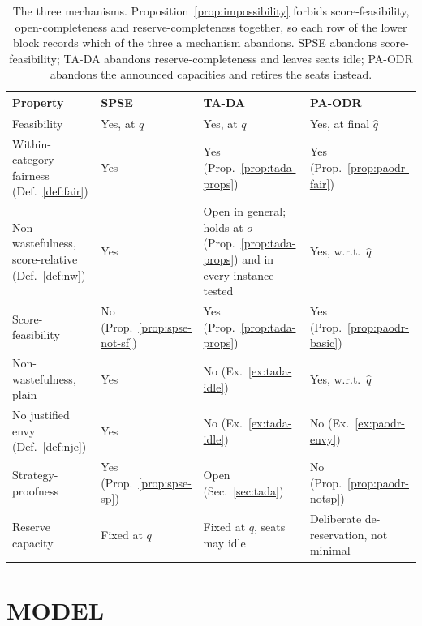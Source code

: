 \documentclass[a4paper,twoside]{article}
\theoremstyle{definition}
\begin{document}
\begin{table}[t]
\caption{The three mechanisms. Proposition~\ref{prop:impossibility} forbids score-feasibility, open-completeness and reserve-completeness together, so each row of the lower block records which of the three a mechanism abandons. SPSE abandons score-feasibility; TA-DA abandons reserve-completeness and leaves seats idle; PA-ODR abandons the announced capacities and retires the seats instead.}
\label{tab:comparison}
\centering
\small
\begin{tabular}{|L{0.22\textwidth}|L{0.20\textwidth}|L{0.24\textwidth}|L{0.24\textwidth}|}
\hline
\textbf{Property} & \textbf{SPSE} & \textbf{TA-DA} & \textbf{PA-ODR} \\
\hline
Feasibility & Yes, at $q$ & Yes, at $q$ & Yes, at final $\hat q$ \\
Within-category fairness (Def.~\ref{def:fair}) & Yes & Yes (Prop.~\ref{prop:tada-props}) & Yes (Prop.~\ref{prop:paodr-fair}) \\
Non-wastefulness, score-relative (Def.~\ref{def:nw}) & Yes & Open in general; holds at $o$ (Prop.~\ref{prop:tada-props}) and in every instance tested & Yes, w.r.t.\ $\hat q$ \\
\hline
Score-feasibility & No (Prop.~\ref{prop:spse-not-sf}) & Yes (Prop.~\ref{prop:tada-props}) & Yes (Prop.~\ref{prop:paodr-basic}) \\
Non-wastefulness, plain & Yes & No (Ex.~\ref{ex:tada-idle}) & Yes, w.r.t.\ $\hat q$ \\
No justified envy (Def.~\ref{def:nje}) & Yes & No (Ex.~\ref{ex:tada-idle}) & No (Ex.~\ref{ex:paodr-envy}) \\
Strategy-proofness & Yes (Prop.~\ref{prop:spse-sp}) & Open (Sec.~\ref{sec:tada}) & No (Prop.~\ref{prop:paodr-notsp}) \\
Reserve capacity & Fixed at $q$ & Fixed at $q$, seats may idle & Deliberate de-reservation, not minimal \\
\hline
\end{tabular}
\end{table}

\section{\uppercase{Model}}
\label{sec:model}
\end{document}
